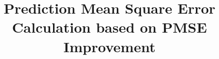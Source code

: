 \documentclass[11pt]{article}
\begin{document}
\thispagestyle{fancy}

\title{\bf Prediction Mean Square Error Calculation based on PMSE Improvement}
\date{}
\maketitle
% 
%
%
%
%
%




\end{document}
